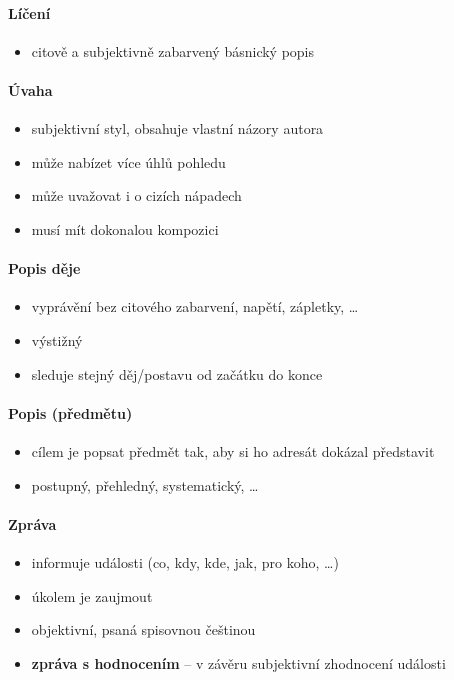 \documentclass[10pt,a4paper]{article}
\begin{document}
\paragraph{Líčení}
\begin{itemize}
\item citově a subjektivně zabarvený básnický popis
\end{itemize}

\paragraph{Úvaha}
\begin{itemize}
\item subjektivní styl, obsahuje vlastní názory autora
\item může nabízet více úhlů pohledu
\item může uvažovat i o cizích nápadech
\item musí mít dokonalou kompozici
\end{itemize}

\paragraph{Popis děje}
\begin{itemize}
\item vyprávění bez citového zabarvení, napětí, zápletky, \ldots
\item výstižný
\item sleduje stejný děj/postavu od začátku do konce
\end{itemize}

\paragraph{Popis (předmětu)}
\begin{itemize}
\item cílem je popsat předmět tak, aby si ho adresát dokázal představit
\item postupný, přehledný, systematický, \ldots
\end{itemize}

\paragraph{Zpráva}
\begin{itemize}
\item informuje události (co, kdy, kde, jak, pro koho, \ldots)
\item úkolem je zaujmout
\item objektivní, psaná spisovnou češtinou
\item \textbf{zpráva s hodnocením} -- v závěru subjektivní zhodnocení události
\end{itemize}
\end{document}
